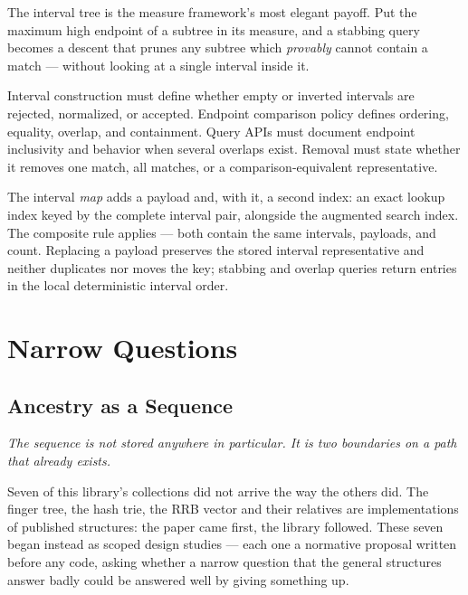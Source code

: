\documentclass[11pt,twoside,openright]{book}
\newcommand{\motto}[1]{%
  \begingroup
  \vspace{-4pt}\hfill\begin{minipage}{0.80\textwidth}
    \raggedleft\itshape\color{d7slate}\small #1\par
  \end{minipage}\par\vspace{18pt}
  \endgroup}
\begin{document}
\noindent
The interval tree is the measure framework's most elegant payoff. Put the
maximum high endpoint of a subtree in its measure, and a stabbing query becomes
a descent that prunes any subtree which \emph{provably} cannot contain a match ---
without looking at a single interval inside it.

\begin{contractbox}
Interval construction must define whether empty or inverted intervals are
rejected, normalized, or accepted. Endpoint comparison policy defines ordering,
equality, overlap, and containment. Query APIs must document endpoint
inclusivity and behavior when several overlaps exist. Removal must state whether
it removes one match, all matches, or a comparison-equivalent representative.
\end{contractbox}

The interval \emph{map} adds a payload and, with it, a second index: an exact
lookup index keyed by the complete interval pair, alongside the augmented search
index. The composite rule applies --- both contain the same intervals, payloads,
and count. Replacing a payload preserves the stored interval representative and
neither duplicates nor moves the key; stabbing and overlap queries return entries
in the local deterministic interval order.

\part{Narrow Questions}

\chapter{Ancestry as a Sequence}
\label{ch:ancestry}

\motto{The sequence is not stored anywhere in particular. It is two boundaries
on a path that already exists.}

\noindent
Seven of this library's collections did not arrive the way the others did.
The finger tree, the hash trie, the RRB vector and their relatives are
implementations of published structures: the paper came first, the library
followed. These seven began instead as scoped design studies --- each one a
normative proposal written before any code, asking whether a narrow question
that the general structures answer badly could be answered well by giving
something up.
\end{document}
